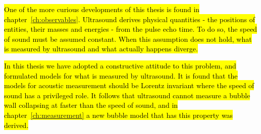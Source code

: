 \hl{One of the more curious developments of this thesis is found in chapter~{\ref{ch:observables}}.
Ultrasound derives physical quantities - the positions of entities, their masses and energies - 
from the pulse echo time.  
To do so, the speed of sound must be assumed constant.
When this assumption does not hold, 
what is measured by ultrasound and what actually happens diverge.   
  }

\hl{
In this thesis we have adopted a constructive attitude to this problem, 
and formulated models for what is measured by ultrasound.
It is found that the models for acoustic measurement 
should be Lorentz invariant where the speed of sound has a privileged role.
%
It follows that ultrasound cannot measure a bubble wall collapsing at faster than the speed of sound,
and in chapter~{\ref{ch:measurement}} a new bubble model that has this property was derived.
}


